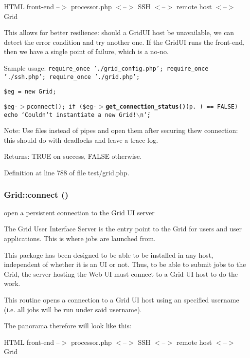 HTML front-end --$>$ processor.php $<$--$>$ SSH $<$--$>$ remote host $<$--$>$ Grid

This allows for better resilience: should a Grid\-UI host be unavailable, we can detect the error condition and try another one. If the Grid\-UI runs the front-end, then we have a single point of failure, which is a no-no.

Sample usage: {\tt  require\_\-once './grid\_\-config.php'; require\_\-once './ssh.php'; require\_\-once './grid.php';}

{\tt  \$eg = new Grid;}

{\tt  \$eg-$>$pconnect(); if (\$eg-$>${\bf get\_\-connection\_\-status()}{\rm (p.\,\pageref{classGrid_a8})} == FALSE) echo \char`\"{}Couldn't instantiate a new Grid!$\backslash$n\char`\"{}; }

\begin{Desc}
\item[Note:]Use files instead of pipes and open them after securing thew connection: this should do with deadlocks and leave a trace log.\end{Desc}
\begin{Desc}
\item[Returns:]TRUE on success, FALSE otherwise. \end{Desc}


Definition at line 788 of file test/grid.php.
\subsubsection{\setlength{\rightskip}{0pt plus 5cm}Grid::connect ()}\label{classGrid_a10}


open a persistent connection to the Grid UI server 

The Grid User Interface Server is the entry point to the Grid for users and user applications. This is where jobs are launched from.

This package has been designed to be able to be installed in any host, independent of whether it is an UI or not. Thus, to be able to submit jobs to the Grid, the server hosting the Web UI must connect to a Grid UI host to do the work.

This routine opens a connection to a Grid UI host using an specified username (i.e. all jobs will be run under said username).

The panorama therefore will look like this:

HTML front-end --$>$ processor.php $<$--$>$ SSH $<$--$>$ remote host $<$--$>$ Grid

